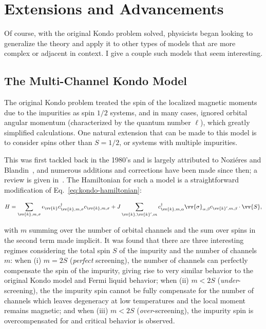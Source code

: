 \section{Extensions and Advancements}

Of course, with the original Kondo problem solved, physicists began looking to generalize the theory and apply it to other types of models that are more complex or adjacent in context. I give a couple such models that seem interesting.


\subsection{The Multi-Channel Kondo Model}

The original Kondo problem treated the spin of the localized magnetic moments due to the impurities as spin $1/2$ systems, and in many cases, ignored orbital angular momentum (characterized by the quantum number $\ell$), which greatly simplified calculations. One natural extension that can be made to this model is to consider spins other than $S=1/2$, or systems with multiple impurities.

This was first tackled back in the 1980's and is largely attributed to Nozi\'eres and Blandin~\cite{Nozieres_1980}, and numerous additions and corrections have been made since then; a review is given in~\cite{Schlottmann_1993}. The Hamiltonian for such a model is a straightforward modification of Eq.~\eqref{eq:kondo-hamiltonian}:

\begin{equation}
  H = \sum_{\vv{k},m,\sigma} \epsilon_{\vv{k}}c_{\vv{k},m,\sigma}^\dagger c_{\vv{k},m,\sigma} + J \sum_{\vv{k},\vv{k}',m} c_{\vv{k},m,\alpha}^\dagger \vv{\sigma}_{\alpha,\beta} c_{\vv{k}',m,\beta} \cdot \vv{S},
\end{equation}

with $m$ summing over the number of orbital channels and the sum over spins in the second term made implicit. It was found that there are three interesting regimes considering the total spin $S$ of the impurity and the number of channels $m$: when (i) $m=2S$ (\textit{perfect} screening), the number of channels can perfectly compensate the spin of the impurity, giving rise to very similar behavior to the original Kondo model and Fermi liquid behavior; when (ii) $m<2S$ (\textit{under}-screening), the the impurity spin cannot be fully compensate for the number of channels which leaves degeneracy at low temperatures and the local moment remains magnetic; and when (iii) $m<2S$ (\textit{over}-screening), the impurity spin is overcompensated for and critical behavior is observed.


